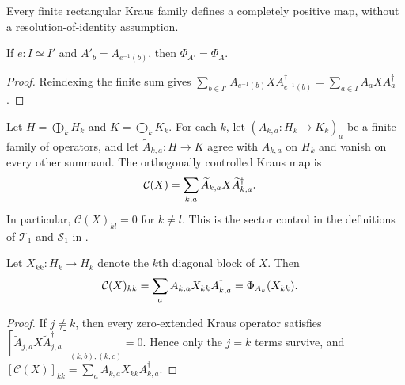 \begin{lemma}
    \label{lem:mpdo_rectangular_kraus_map_cp}
    \leanok
    Every finite rectangular Kraus family defines a completely positive map,
    without a resolution-of-identity assumption.
\end{lemma}

\begin{theorem}
    \label{thm:mpdo_rectangular_kraus_map_equiv}
    \leanok
    If $e:I\simeq I'$ and $A'_b=A_{e^{-1}(b)}$, then
    $\Phi_{A'}=\Phi_A$.
\end{theorem}
\begin{proof}
    \leanok
    Reindexing the finite sum gives
    $\sum_{b\in I'}A_{e^{-1}(b)}XA_{e^{-1}(b)}^\dagger
    =\sum_{a\in I}A_aXA_a^\dagger$.
\end{proof}

\begin{definition}
    \label{def:mpdo_controlled_kraus_map}
    \leanok
    Let $H=\bigoplus_k H_k$ and $K=\bigoplus_k K_k$. For each $k$, let
    $(A_{k,a}:H_k\to K_k)_a$ be a finite family of operators, and let
    $\widetilde A_{k,a}:H\to K$ agree with $A_{k,a}$ on $H_k$ and vanish on
    every other summand. The orthogonally controlled Kraus map is
    \begin{align}
        \mathcal C(X)
        &=\sum_{k,a}\widetilde A_{k,a}X\widetilde A_{k,a}^\dagger.
        \notag
    \end{align}
    In particular, $\mathcal C(X)_{kl}=0$ for $k\ne l$. This is the sector
    control in the definitions of $\mathcal T_1$ and $\mathcal S_1$ in
    \cite[Appendix~C.2, lines~1523--1535 and~1548--1555]
      {Cirac2016MPDO_arXiv}.
\end{definition}

\begin{theorem}
    \label{thm:mpdo_controlled_kraus_map_same_block}
    \leanok
    Let $X_{kk}:H_k\to H_k$ denote the $k$th diagonal block of $X$. Then
    \begin{align}
        \mathcal C(X)_{kk}
        &=\sum_a A_{k,a}X_{kk}A_{k,a}^\dagger
          =\Phi_{A_k}(X_{kk}).
        \notag
    \end{align}
\end{theorem}
\begin{proof}
    \leanok
    If $j\ne k$, then every zero-extended Kraus operator satisfies
    $[\widetilde A_{j,a}X\widetilde A_{j,a}^\dagger]_{(k,b),(k,c)}=0$.
    Hence only the $j=k$ terms survive, and
    $[\mathcal C(X)]_{kk}=\sum_a A_{k,a}X_{kk}A_{k,a}^\dagger$.
\end{proof}

